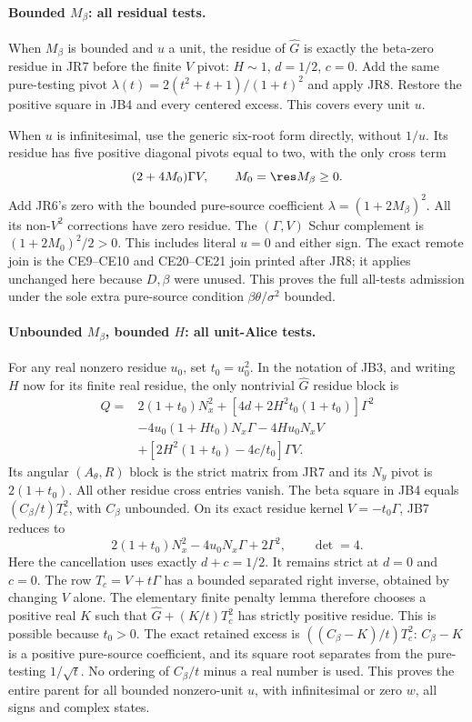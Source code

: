 \paragraph{Bounded $M_\beta$: all residual tests.}
When $M_\beta$ is bounded and $u$ a unit, the residue of $\widehat G$
is exactly the beta-zero residue in JR7 before the finite $V$ pivot:
$H\sim1$, $d=1/2$, $c=0$. Add the same pure-testing pivot
$\lambda(t)=2(t^2+t+1)/(1+t)^2$ and apply JR8. Restore the positive
square in JB4 and every centered excess. This covers every unit $u$.

When $u$ is infinitesimal, use the generic six-root form directly,
without $1/u$. Its residue has five positive diagonal pivots equal to
two, with the only cross term
\[
 (2+4M_0)\Gamma V,\qquad M_0=\res M_\beta\ge0.
\]
Add JR6's zero with the bounded pure-source coefficient
$\lambda=(1+2M_\beta)^2$. All its non-$V^2$ corrections have zero
residue. The $(\Gamma,V)$ Schur complement is
$(1+2M_0)^2/2>0$. This includes literal $u=0$ and either sign.
The exact remote join is the CE9--CE10 and CE20--CE21 join printed
after JR8; it applies unchanged here because $D,\beta$ were unused.
This proves the full all-tests admission under the sole extra
pure-source condition $\beta\theta/\sigma^2$ bounded.

\paragraph{Unbounded $M_\beta$, bounded $H$: all unit-Alice tests.}
For any real nonzero residue $u_0$, set $t_0=u_0^2$. In the notation
of JB3, and writing $H$ now for its finite real residue, the only
nontrivial $\widehat G$ residue block is
\begin{align*}
 Q={}&2(1+t_0)N_x^2+[4d+2H^2t_0(1+t_0)]\Gamma^2\\
 &-4u_0(1+Ht_0)N_x\Gamma-4Hu_0N_xV\\
 &+[2H^2(1+t_0)-4c/t_0]\Gamma V.
\tag{JB7}
\end{align*}
Its angular $(A_\theta,R)$ block is the strict matrix from JR7 and
its $N_y$ pivot is $2(1+t_0)$. All other residue cross entries vanish.
The beta square in JB4 equals $(C_\beta/t)T_c^2$, with
$C_\beta$ unbounded. On its exact residue kernel $V=-t_0\Gamma$,
JB7 reduces to
\[
 2(1+t_0)N_x^2-4u_0N_x\Gamma+2\Gamma^2,
 \qquad \det=4.
\tag{JB8}
\]
Here the cancellation uses exactly $d+c=1/2$. It remains strict at
$d=0$ and $c=0$. The row $T_c=V+t\Gamma$ has a bounded separated
right inverse, obtained by changing $V$ alone. The elementary finite
penalty lemma therefore chooses a positive real $K$ such that
$\widehat G+(K/t)T_c^2$ has strictly positive residue. This is possible
because $t_0>0$. The exact retained excess is
$((C_\beta-K)/t)T_c^2$: $C_\beta-K$ is a positive pure-source
coefficient, and its square root separates from the pure-testing
$1/\sqrt t$. No ordering of $C_\beta/t$ minus a real number is used.
This proves the entire
parent for all bounded nonzero-unit $u$, with infinitesimal or zero
$w$, all signs and complex states.

